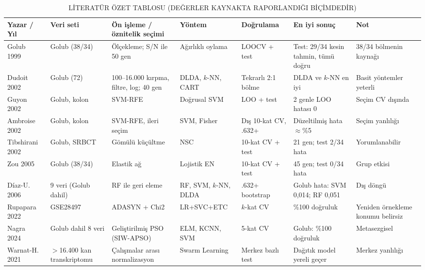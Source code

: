 \documentclass[conference]{IEEEtran}
\begin{document}
\begin{table}[!t]
\caption{LİTERATÜR ÖZET TABLOSU (DEĞERLER KAYNAKTA RAPORLANDIĞI BİÇİMDEDİR)}
\label{tab:lit}
\centering\scriptsize\setlength{\tabcolsep}{2.5pt}\renewcommand{\arraystretch}{0.95}
\begin{tabularx}{\textwidth}{@{}p{1.65cm}p{1.95cm}p{2.7cm}p{1.9cm}p{2.15cm}p{2.6cm}X@{}}
\toprule
\textbf{Yazar / Yıl} & \textbf{Veri seti} & \textbf{Ön işleme / öznitelik seçimi} & \textbf{Yöntem} & \textbf{Doğrulama} & \textbf{En iyi sonuç} & \textbf{Not}\\
\midrule
Golub 1999~\cite{golub1999} & Golub (38/34) & Ölçekleme; S/N ile 50 gen & Ağırlıklı oylama & LOOCV + test & Test: 29/34 kesin tahmin, tümü doğru & 38/34 bölmenin kaynağı\\
Dudoit 2002~\cite{dudoit2002} & Golub (72) & 100--16.000 kırpma, filtre, log; 40 gen & DLDA, $k$-NN, CART & Tekrarlı 2:1 bölme & DLDA ve $k$-NN en iyi & Basit yöntemler yeterli\\
Guyon 2002~\cite{guyon2002} & Golub, kolon & SVM-RFE & Doğrusal SVM & LOO + test & 2 genle LOO hatası 0 & Seçim CV dışında\\
Ambroise 2002~\cite{ambroise2002} & Golub, kolon & SVM-RFE, ileri seçim & SVM, Fisher & Dış 10-kat CV, .632+ & Düzeltilmiş hata $\approx$\%5 & Seçim yanlılığı\\
Tibshirani 2002~\cite{tibshirani2002} & Golub, SRBCT & Gömülü küçültme & NSC & 10-kat CV + test & 21 gen; test 2/34 hata & Yorumlanabilir\\
Zou 2005~\cite{zou2005} & Golub (38/34) & Elastik ağ & Lojistik EN & 10-kat CV + test & 45 gen; test 0/34 hata & Grup etkisi\\
Díaz-U. 2006~\cite{diaz2006} & 9 veri (Golub dahil) & RF ile geri eleme & RF, SVM, $k$-NN, DLDA & .632+ bootstrap & Golub hata: SVM 0,014; RF 0,051 & Dış döngü\\
Rupapara 2022~\cite{rupapara2022} & GSE28497 & ADASYN + Chi2 & LR+SVC+ETC & $k$-kat CV & \%100 doğruluk & Yeniden örnekleme konumu belirsiz\\
Nagra 2024~\cite{nagra2024} & Golub dahil 8 veri & Geliştirilmiş PSO (SIW-APSO) & ELM, KCNN, SVM & 5-kat CV & Golub: \%100 doğruluk & Metasezgisel\\
Warnat-H. 2021~\cite{warnat2021} & $>$16.400 kan transkriptomu & Çalışmalar arası normalizasyon & Swarm Learning & Merkez bazlı test & Dağıtık model yereli geçer & Merkez yanlılığı\\
\bottomrule
\end{tabularx}
\end{table}
\end{document}
